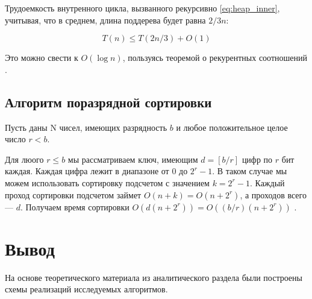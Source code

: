 Трудоемкость внутренного цикла, вызванного рекурсивно \ref{eq:heap_inner}, учитывая, что в среднем, длина поддерева будет равна $2/3n$:
    
\begin{equation}
    T(n) \leq T(2n/3) + O(1)
    \label{eq:heap_inner}
\end{equation}

Это можно свести к $O(\log n)$, пользуясь теоремой о рекурентных соотношений \cite{intro_to_algo_heap}.

\subsection{Алгоритм поразрядной сортировки}
Пусть даны N чисел, имеющих разрядность $b$ и любое положительное целое число $r < b$.

Для люого $r \leq b$ мы рассматриваем ключ, имеющим $d = [ b / r ]$ цифр по $r$ бит каждая. Каждая цифра лежит в диапазоне от $0$ до $2^{r} - 1$. В таком случае мы можем использовать сортировку подсчетом с значением $k = 2^r - 1$. Каждый проход сортировки подсчетом займет $O(n + k) = O(n + 2^r)$, а проходов всего --- $d$. Получаем время сортировки $O(d(n + 2^r)) = O((b/r)(n + 2^r))$ \cite{intro_to_algo_radix}.





\section{Вывод}

На основе теоретического материала из аналитического раздела были построены схемы реализаций исследуемых алгоритмов.

